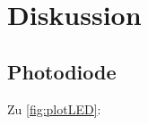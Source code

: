 \newpage
\section{Diskussion}
\subsection{Photodiode}
Zu \ref{fig:plotLED}:\\


\label{sec:Diskussion}
